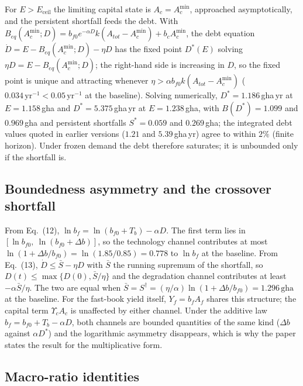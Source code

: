\documentclass[11pt,a4paper]{article}
\newcommand{\Ups}{\Upsilon_c}
\newcommand{\Eceil}{E_{\mathrm{ceil}}}
\newcommand{\Acmin}{A_c^{\min}}
\begin{document}
For $E>\Eceil$ the limiting capital state is $A_c=\Acmin$, approached asymptotically, and the persistent shortfall feeds the debt. With $B_{eq}(\Acmin;D)=b_{f0}e^{-\alpha D}k(A_{tot}-\Acmin)+b_c\Acmin$, the debt equation $\dot D=E-B_{eq}(\Acmin;D)-\eta D$ has the fixed point $D^*(E)$ solving $\eta D=E-B_{eq}(\Acmin;D)$; the right-hand side is increasing in $D$, so the fixed point is unique and attracting whenever $\eta>\alpha b_{f0}k(A_{tot}-\Acmin)$ ($0.034\,\mathrm{yr}^{-1}<0.05\,\mathrm{yr}^{-1}$ at the baseline). Solving numerically, $D^*=1.186$\,gha\,yr at $E=1.158$\,gha and $D^*=5.375$\,gha\,yr at $E=1.238$\,gha, with $B(D^*)=1.099$ and $0.969$\,gha and persistent shortfalls $S^*=0.059$ and $0.269$\,gha; the integrated debt values quoted in earlier versions ($1.21$ and $5.39$\,gha\,yr) agree to within $2\%$ (finite horizon). Under frozen demand the debt therefore saturates; it is unbounded only if the shortfall is.

\subsection{Boundedness asymmetry and the crossover shortfall}\label{si:bounded}

From Eq.~(12), $\ln b_f=\ln(b_{f0}+T_b)-\alpha D$. The first term lies in $[\ln b_{f0},\ \ln(b_{f0}+\Delta b)]$, so the technology channel contributes at most $\ln(1+\Delta b/b_{f0})=\ln(1.85/0.85)=0.778$ to $\ln b_f$ at the baseline. From Eq.~(13), $\dot D\le\bar S-\eta D$ with $\bar S$ the running supremum of the shortfall, so $D(t)\le\max\{D(0),\bar S/\eta\}$ and the degradation channel contributes at least $-\alpha\bar S/\eta$. The two are equal when $\bar S=S^\dagger=(\eta/\alpha)\ln(1+\Delta b/b_{f0})=1.296\,\mathrm{gha}$ at the baseline. For the fast-book yield itself, $Y_f=b_fA_f$ shares this structure; the capital term $\Ups A_c$ is unaffected by either channel. Under the additive law $b_f=b_{f0}+T_b-\alpha D$, both channels are bounded quantities of the same kind ($\Delta b$ against $\alpha D^*$) and the logarithmic asymmetry disappears, which is why the paper states the result for the multiplicative form.

\subsection{Macro-ratio identities}\label{si:ratios}
\end{document}
